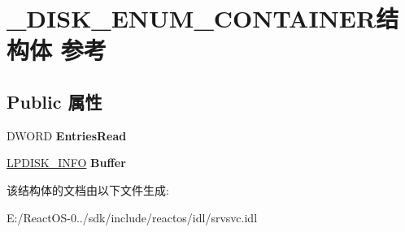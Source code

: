 \hypertarget{struct___d_i_s_k___e_n_u_m___c_o_n_t_a_i_n_e_r}{}\section{\+\_\+\+D\+I\+S\+K\+\_\+\+E\+N\+U\+M\+\_\+\+C\+O\+N\+T\+A\+I\+N\+E\+R结构体 参考}
\label{struct___d_i_s_k___e_n_u_m___c_o_n_t_a_i_n_e_r}
\subsection*{Public 属性}
\begin{DoxyCompactItemize}
\item 
\mbox{\label{struct___d_i_s_k___e_n_u_m___c_o_n_t_a_i_n_e_r_a86a927ab7ff9896a37c90eae2d7ef9fb}} 
D\+W\+O\+RD {\bfseries Entries\+Read}
\item 
\mbox{\label{struct___d_i_s_k___e_n_u_m___c_o_n_t_a_i_n_e_r_a03eb52a1aa9084daffa809471706da77}} 
\hyperlink{struct___d_i_s_k___i_n_f_o}{L\+P\+D\+I\+S\+K\+\_\+\+I\+N\+FO} {\bfseries Buffer}
\end{DoxyCompactItemize}


该结构体的文档由以下文件生成\+:\begin{DoxyCompactItemize}
\item 
E\+:/\+React\+O\+S-\/0../sdk/include/reactos/idl/srvsvc.\+idl\end{DoxyCompactItemize}
